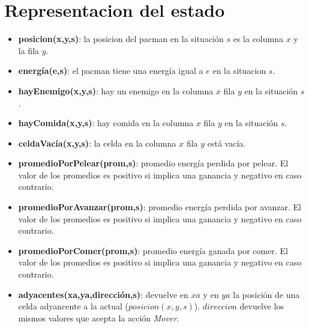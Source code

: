 \section{Representacion del estado}

\begin{itemize}

\item \textbf{posicion(x,y,s)}: la posicion del pacman en la situación $s$ es
la columna $x$ y la fila $y$.

\item \textbf{energía(e,s)}: el pacman tiene una energía igual a $e$ en la
situacion $s$.

\item \textbf{hayEnemigo(x,y,s)}: hay un enemigo en la columna $x$ fila $y$ en
la situación $s$.

\item \textbf{hayComida(x,y,s)}: hay comida en la columna $x$ fila $y$ en la
situación $s$.

\item \textbf{celdaVacía(x,y,s)}: la celda en la columna $x$ fila $y$ está
vacía.

\item \textbf{promedioPorPelear(prom,s)}: promedio energía perdida por pelear.
El valor de los promedios es positivo si implica una ganancia y negativo en
caso contrario.

\item \textbf{promedioPorAvanzar(prom,s)}: promedio energía perdida por
avanzar. El valor de los promedios es positivo si implica una ganancia y
negativo en caso contrario.

\item \textbf{promedioPorComer(prom,s)}: promedio energía ganada por comer. El
valor de los promedios es positivo si implica una ganancia y negativo en caso
contrario.

\item \textbf{adyacentes(xa,ya,dirección,s)}: devuelve en $xa$ y en $ya$ la
posición de una celda adyancente a la actual ($posicion(x,y,s)$). $direccion$
devuelve los mismos valores que acepta la acción \emph{Mover}.

\end{itemize}
